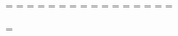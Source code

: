     \newtoks\jobdir                  \jobdir={}
    \newtoks\tempnametoks            \tempnametoks={}
    \newtoks\oldheadline             \oldheadline={}
    \newtoks\oldfootline             \oldfootline={}
    \newtoks\subsectstyle            \subsectstyle={\Number}
    \newtoks\subsubsectstyle         \subsubsectstyle={\Number}
    \newtoks\runningheadlines        \runningheadlines={\relax}
    \newtoks\chapterformat           \chapterformat={\titlestyle}
    \newtoks\sectionformat           \sectionformat={\relax}
    \newtoks\subsectionformat        \subsectionformat={\relax}
    \newtoks\subsubsectionformat     \subsubsectionformat={\relax}
    \newtoks\chapterfontstyle        \chapterfontstyle={\bf}
    \newtoks\sectionfontstyle        \sectionfontstyle={\rm}
    \newtoks\subsectionfontstyle     \subsectionfontstyle={\rm}
    \newtoks\sectionfontstyleb       \sectionfontstyleb={\caps}
    \newtoks\subsubsectionfontstyle  \subsubsectionfontstyle={\rm}

    \newcount\subsectnumber           {}
    \newcount\subsubsectnumber        {}


   \newdimen\pictureindent           \pictureindent=15pt
   \newdimen\str
   \newdimen\squareht
   \newdimen\squarewd
   \newskip\doublecolskip
   \newskip\tableoftablesskip        \tableoftablesskip=\baselineskip


   \newbox\squarebox


   \newskip\sectionindent            \sectionindent=0pt
   \newskip\subsectionindent         \subsectionindent=0pt
  \def\thechapterhead{\relax}
  \def\thesectionhead{\relax}
  \def\thesubsecthead{\relax}
  \def\thesubsubsecthead{\relax}


